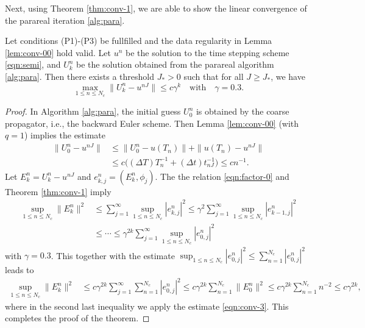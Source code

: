Next, using Theorem \ref{thm:conv-1}, we are able to show the linear convergence of the parareal iteration \ref{alg:para}.

\begin{theorem}\label{thm:conv-2}
Let conditions (P1)-(P3) be fullfilled and the data regularity in Lemma \ref{lem:conv-00} hold valid. Let $u^n$ be the solution to the time stepping scheme \eqref{eqn:semi},
and $U_k^n$ be the solution obtained from the parareal algorithm \ref{alg:para}.  Then there exists a threshold $J_*>0$ such that
for all $J\ge J_*$,
 we have
$$ \max_{1 \le n\le N_c} \| U_k^n - u^{nJ} \|  \le c \gamma^k\quad \text{with} \quad \gamma=0.3.$$
\end{theorem}

\begin{proof}
In Algorithm \ref{alg:para}, the initial guess $U_0^n$ is obtained by the coarse propagator, i.e., the backward Euler scheme.
Then Lemma \ref{lem:conv-00} (with $q=1$) implies the estimate
\begin{equation}\label{eqn:conv-3}
\begin{aligned}
 \| U_0^n - u^{nJ} \| &\le \| U_0^n - u(T_n)\|  + \|u(T_n)- u^{nJ} \| \\
 &\le c \big((\Delta T) T_n^{-1} + (\Delta t) t_{nJ}^{-1} \big)\le c n^{-1}.
\end{aligned}
\end{equation}
Let $E_k^n =U_k^n - u^{nJ}$ and $e_{k,j}^n = (E_k^n, \phi_j)$. The the relation \eqref{eqn:factor-0} and
Theorem \ref{thm:conv-1} imply
\begin{equation*}
\begin{aligned}
\sup_{1\le n\le N_c} \|  E_k^n \|^2
& \le  \sum_{j=1}^\infty \sup_{1\le n\le N_c} | e_{k,j}^n |^2 \le \gamma^2  \sum_{j=1}^\infty \sup_{1\le n\le N_c} | e_{k-1,j}^n |^2\\
& \le \cdots     \le \gamma^{2k}  \sum_{j=1}^\infty \sup_{1\le n\le N_c} | e_{0,j}^n |^2
    \end{aligned}
\end{equation*}
with $\gamma = 0.3$. This together with the estimate
$
  \sup_{1\le n\le N_c} | e_{0,j}^n |^2 %
   \le  \sum_{n=1}^{N_c} | e_{0,j}^n |^2
$
leads to
\begin{equation*}
\begin{aligned}
\sup_{1\le n\le N_c} \|  E_k^n \|^2  &\le c \gamma^{2k}  \sum_{j=1}^\infty  \sum_{n=1}^{N_c} | e_{0,j}^n |^2
 \le  c \gamma^{2k}   \sum_{n=1}^{N_c} \| E_{0}^n \|^2
  \le  c \gamma^{2k}   \sum_{n=1}^{N_c} n^{-2}
 \le c \gamma^{2k} ,
    \end{aligned}
\end{equation*}
where in the second last inequality we apply the estimate \eqref{eqn:conv-3}.
 This completes the proof of the theorem.
\end{proof}


